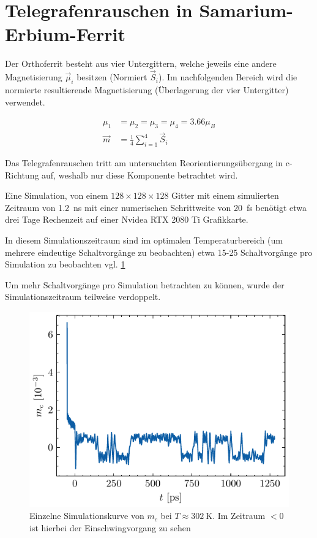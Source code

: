 \documentclass[main.tex]{subfiles}
\begin{document}
\newpage
\section{Telegrafenrauschen in Samarium-Erbium-Ferrit}

Der Orthoferrit besteht aus vier Untergittern, welche jeweils eine andere Magnetisierung \(\vec{\mu}_i\) besitzen (Normiert \(\vec{S}_i\)). Im nachfolgenden Bereich wird die normierte resultierende Magnetisierung (Überlagerung der vier Untergitter) verwendet.

\begin{align}
    \mu_{1} &=  \mu_{2} = \mu_{3} = \mu_{4} = \num{3.66}\mu_B \\
    \vec{m} &= \frac{1}{4} \sum_{i=1}^4 \vec{S}_i
\end{align}

Das Telegrafenrauschen tritt am untersuchten Reorientierungsübergang in c-Richtung auf, weshalb nur diese Komponente betrachtet wird. 


Eine Simulation, von einem \(128 \times 128 \times 128\) Gitter mit einem simulierten Zeitraum von \SI{1.2}{\nano\second} mit einer numerischen Schrittweite von \SI{20}{\femto\second} benötigt etwa drei Tage Rechenzeit auf einer Nvidea RTX 2080 Ti Grafikkarte. 

In diesem Simulationszeitraum sind im optimalen Temperaturbereich (um mehrere eindeutige Schaltvorgänge zu beobachten) etwa 15-25 Schaltvorgänge pro Simulation zu beobachten vgl. \cref{fig:bsp-run}

Um mehr Schaltvorgänge pro Simulation betrachten zu können, wurde der Simulationszeitraum teilweise verdoppelt.

\begin{figure}[h]
    \centering
    \includegraphics{bilder/plots/theo-vis/example-telegraph-sim.pdf}
    \caption{Einzelne Simulationskurve von \(m_c\) bei \(T \approx \SI{302}{\kelvin}\). Im Zeitraum \(<0\) ist hierbei der Einschwingvorgang zu sehen 
    }\label{fig:bsp-run}
\end{figure}
\end{document}
